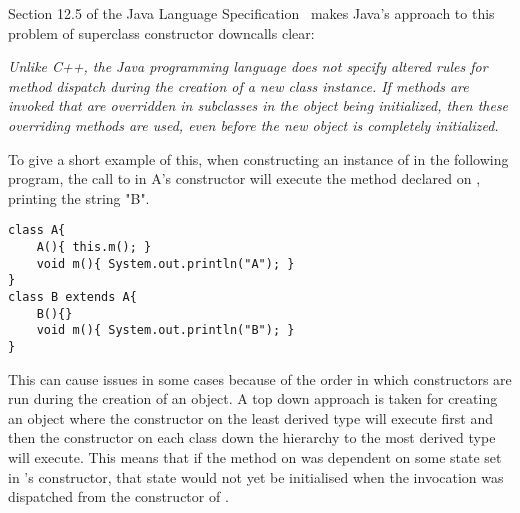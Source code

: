 Section 12.5 of the Java Language Specification~\cite{JavaLangSpec} makes Java's approach to this problem of superclass constructor downcalls clear:
\begin{displayquote}\textit{
		Unlike C++, the Java programming language does not specify altered rules for method dispatch during the creation of a new class instance. If methods are invoked that are overridden in subclasses in the object being initialized, then these overriding methods are used, even before the new object is completely initialized.~\cite{JavaLangSpec}}
\end{displayquote}
To give a short example of this, when constructing an instance of  in the following program, the call to  in A's constructor will execute the method  declared on , printing the string "B".
\begin{lstlisting}
class A{
	A(){ this.m(); }
	void m(){ System.out.println("A"); }
}
class B extends A{
	B(){}
	void m(){ System.out.println("B"); }
}
\end{lstlisting}
This can cause issues in some cases because of the order in which constructors are run during the creation of an object. A top down approach is taken for creating an object where the constructor on the least derived type will execute first and then the constructor on each class down the hierarchy to the most derived type will execute. This means that if the  method on  was dependent on some state set in 's constructor, that state would not yet be initialised when the invocation was dispatched from the constructor of .

